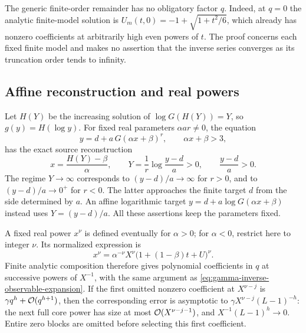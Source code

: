 The generic finite-order remainder has no obligatory factor $q$.
Indeed, at $q=0$ the analytic finite-model solution is
$U_m(t,0)=-1+\sqrt{1+t^2/6}$, which already has nonzero coefficients
at arbitrarily high even powers of $t$. The proof concerns each fixed
finite model and makes no assertion that the inverse series converges
as its truncation order tends to infinity.

\subsection{Affine reconstruction and real powers}

Let $H(Y)$ be the increasing solution of $\log G(H(Y))=Y$, so
$g(y)=H(\log y)$. For fixed real parameters
$\alpha a r\ne0$, the equation
\[
 y=d+a\,G(\alpha x+\beta)^r,\qquad \alpha x+\beta>3,
\]
has the exact source reconstruction
\begin{equation}
 x=\frac{H(Y)-\beta}{\alpha},\qquad
 Y=\frac1r\log\frac{y-d}{a}>0,
 \qquad \frac{y-d}{a}>0.
 \label{eq:barnes-inverse-affine-reconstruction}
\end{equation}
The regime $Y\to\infty$ corresponds to $(y-d)/a\to\infty$ for
$r>0$, and to $(y-d)/a\to0^+$ for $r<0$. The latter approaches
the finite target $d$ from the side determined by $a$.
An affine logarithmic target $y=d+a\log G(\alpha x+\beta)$ instead
uses $Y=(y-d)/a$. All these assertions keep the parameters fixed.

A fixed real power $x^\nu$ is defined eventually for $\alpha>0$;
for $\alpha<0$, restrict here to integer $\nu$. Its normalized
expression is
\[
 x^\nu=\alpha^{-\nu}X^\nu
       \bigl(1+(1-\beta)t+U\bigr)^\nu.
\]
Finite analytic composition therefore gives polynomial coefficients
in $q$ at successive powers of $X^{-1}$, with the same argument as
\eqref{eq:gamma-inverse-observable-expansion}. If the first omitted
nonzero coefficient at $X^{\nu-j}$ is
$\gamma q^h+\mathcal O(q^{h+1})$, then the corresponding error is
asymptotic to $\gamma X^{\nu-j}(L-1)^{-h}$: the next full core power
has size at most $\mathcal O(X^{\nu-j-1})$, and
$X^{-1}(L-1)^h\to0$. Entire zero blocks are omitted before selecting
this first coefficient.

